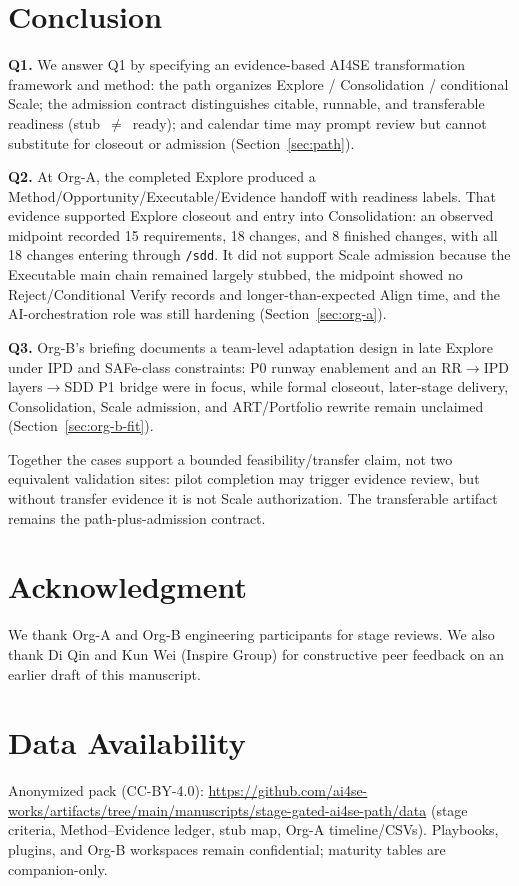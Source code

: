 \documentclass[10pt,conference]{IEEEtran}
\begin{document}
\section{Conclusion}
\label{sec:conclusion}

\textbf{Q1.}
We answer Q1 by specifying an evidence-based AI4SE transformation framework
and method: the path organizes Explore / Consolidation / conditional Scale; the
admission contract distinguishes citable, runnable, and transferable readiness
(stub~$\neq$~ready); and calendar time may prompt review but cannot substitute
for closeout or admission (Section~\ref{sec:path}).

\textbf{Q2.}
At Org-A, the completed Explore produced a Method/Opportunity/Executable/Evidence
handoff with readiness labels.  That evidence supported Explore closeout and
entry into Consolidation: an observed midpoint recorded 15 requirements,
18 changes, and 8 finished changes, with all 18 changes entering through
\texttt{/sdd}.  It did not support Scale admission because the Executable
main chain remained largely stubbed, the midpoint showed no
Reject/Conditional Verify records and longer-than-expected Align time, and
the AI-orchestration role was still hardening (Section~\ref{sec:org-a}).

\textbf{Q3.}
Org-B's briefing documents a team-level adaptation design in late Explore under
IPD and SAFe-class constraints: P0 runway enablement and an
RR$\rightarrow$IPD layers$\rightarrow$SDD P1 bridge were in focus, while formal
closeout, later-stage delivery, Consolidation, Scale admission, and
ART/Portfolio rewrite remain unclaimed (Section~\ref{sec:org-b-fit}).

Together the cases support a bounded feasibility/transfer claim, not two
equivalent validation sites: pilot completion may trigger evidence review, but
without transfer evidence it is not Scale authorization.
The transferable artifact remains the path-plus-admission contract.

\section*{Acknowledgment}
We thank Org-A and Org-B engineering participants for stage reviews.
We also thank Di Qin and Kun Wei (Inspire Group) for constructive peer feedback
on an earlier draft of this manuscript.

\section*{Data Availability}
Anonymized pack (CC-BY-4.0):
\url{https://github.com/ai4se-works/artifacts/tree/main/manuscripts/stage-gated-ai4se-path/data}
(stage criteria, Method--Evidence ledger, stub map, Org-A timeline/CSVs).
Playbooks, plugins, and Org-B workspaces remain confidential; maturity tables
are companion-only.

\balance


\end{document}
